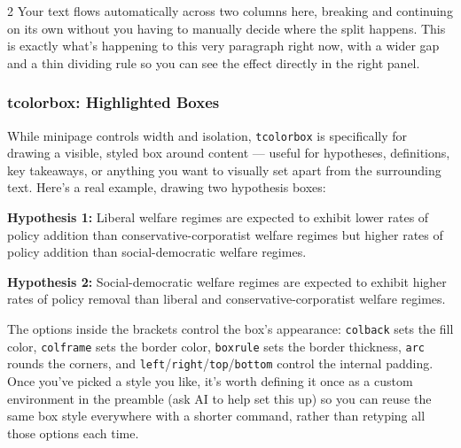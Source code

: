 \begin{multicols}{2}
Your text flows automatically across two columns here, breaking and continuing on its own without you having to manually decide where the split happens. This is exactly what's happening to this very paragraph right now, with a wider gap and a thin dividing rule so you can see the effect directly in the right panel.
\end{multicols}

\subsubsection*{tcolorbox: Highlighted Boxes}
While minipage controls width and isolation, \texttt{tcolorbox} is specifically for drawing a visible, styled box around content --- useful for hypotheses, definitions, key takeaways, or anything you want to visually set apart from the surrounding text. Here's a real example, drawing two hypothesis boxes:

\bigskip

\begin{tcolorbox}[colback=gray!10, colframe=gray!40,
                  boxrule=0.6pt, arc=3pt, left=6pt, right=6pt,
                  top=4pt, bottom=4pt]
\textbf{Hypothesis 1:} Liberal welfare regimes are expected to exhibit lower rates of policy addition than conservative-corporatist welfare regimes but higher rates of policy addition than social-democratic welfare regimes.
\end{tcolorbox}

\medskip

\begin{tcolorbox}[colback=gray!10, colframe=gray!40,
                  boxrule=0.6pt, arc=3pt, left=6pt, right=6pt,
                  top=4pt, bottom=4pt]
\textbf{Hypothesis 2:} Social-democratic welfare regimes are expected to exhibit higher rates of policy removal than liberal and conservative-corporatist welfare regimes.
\end{tcolorbox}

\bigskip 

The options inside the brackets control the box's appearance: \verb|colback| sets the fill color, \verb|colframe| sets the border color, \verb|boxrule| sets the border thickness, \verb|arc| rounds the corners, and \verb|left|/\verb|right|/\verb|top|/\verb|bottom| control the internal padding. Once you've picked a style you like, it's worth defining it once as a custom environment in the preamble (ask AI to help set this up) so you can reuse the same box style everywhere with a shorter command, rather than retyping all those options each time.

